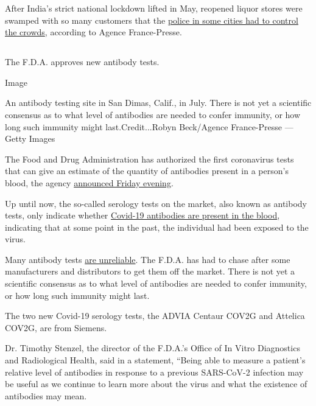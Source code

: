 After India's strict national lockdown lifted in May, reopened liquor
stores were swamped with so many customers that the
\href{https://news.yahoo.com/chaos-outside-liquor-stores-india-eases-virus-lockdown-112326078.html}{police
in some cities had to control the crowds}, according to Agence
France-Presse.

\hypertarget{-11}{%
\subsection{}\label{-11}}

The F.D.A. approves new antibody tests.

Image

An antibody testing site in San Dimas, Calif., in July. There is not yet
a scientific consensus as to what level of antibodies are needed to
confer immunity, or how long such immunity might last.Credit...Robyn
Beck/Agence France-Presse --- Getty Images

The Food and Drug Administration has authorized the first coronavirus
tests that can give an estimate of the quantity of antibodies present in
a person's blood, the agency
\href{https://www.fda.gov/news-events/press-announcements/coronavirus-covid-19-update-fda-authorizes-first-tests-estimate-patients-antibodies-past-sars-cov-2}{announced
Friday evening}.

Up until now, the so-called serology tests on the market, also known as
antibody tests, only indicate whether
\href{https://www.nytimes.com/2020/07/26/health/coronvirus-antibody-tests.html}{Covid-19
antibodies are present in the blood}, indicating that at some point in
the past, the individual had been exposed to the virus.

Many antibody tests
\href{https://www.nytimes.com/2020/05/04/health/fda-antibody-tests-coronavirus.html}{are
unreliable}. The F.D.A. has had to chase after some manufacturers and
distributors to get them off the market. There is not yet a scientific
consensus as to what level of antibodies are needed to confer immunity,
or how long such immunity might last.

The two new Covid-19 serology tests, the ADVIA Centaur COV2G and
Attelica COV2G, are from Siemens.

Dr. Timothy Stenzel, the director of the F.D.A.'s Office of In Vitro
Diagnostics and Radiological Health, said in a statement, ``Being able
to measure a patient's relative level of antibodies in response to a
previous SARS-CoV-2 infection may be useful as we continue to learn more
about the virus and what the existence of antibodies may mean.

